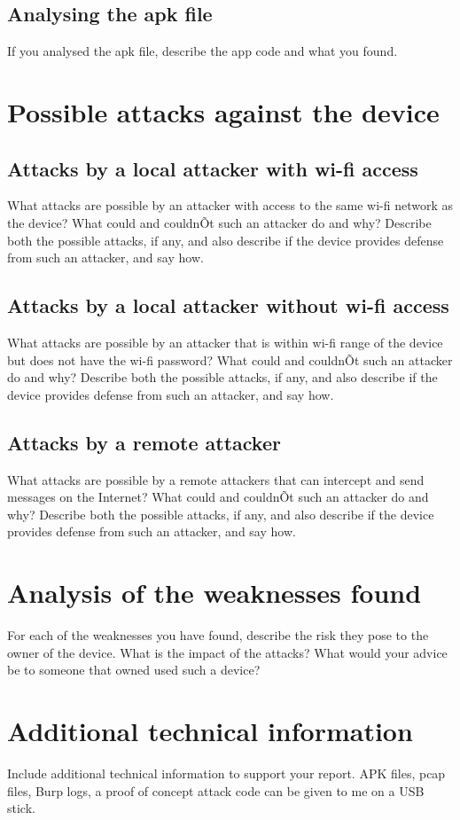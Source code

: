 \documentclass[11pt]{article}
\begin{document}
\subsection{Analysing the apk file}

If you analysed the apk file, describe the app code and what you found.

\section{Possible attacks against the device}


\subsection{Attacks by a local attacker with wi-fi access}

What attacks are possible by an attacker with access to the same wi-fi network as the device? What could and couldnÕt such an attacker do and why? Describe both the possible attacks, if any, and also describe if the device provides defense from such an attacker, and say how. 

\subsection{Attacks by a local attacker without wi-fi access}

What attacks are possible by an attacker that is within wi-fi range of the device but does not have the wi-fi password? What could and couldnÕt such an attacker do and why? Describe both the possible attacks, if any, and also describe if the device provides defense from such an attacker, and say how. 

\subsection{Attacks by a remote attacker}

What attacks are possible by a remote attackers that can intercept and send messages on the Internet? What could and couldnÕt such an attacker do and why? Describe both the possible attacks, if any, and also describe if the device provides defense from such an attacker, and say how. 

\section{Analysis of the weaknesses found}

For each of the weaknesses you have found, describe the risk they pose to the owner of the device. What is the impact of the attacks? What would your advice be to someone that owned used such a device?


 
\appendix

\section{Additional technical information}

Include additional technical information to support your report. APK files, pcap files, Burp logs, a proof of concept attack code can be given to me on a USB stick.
\end{document}
